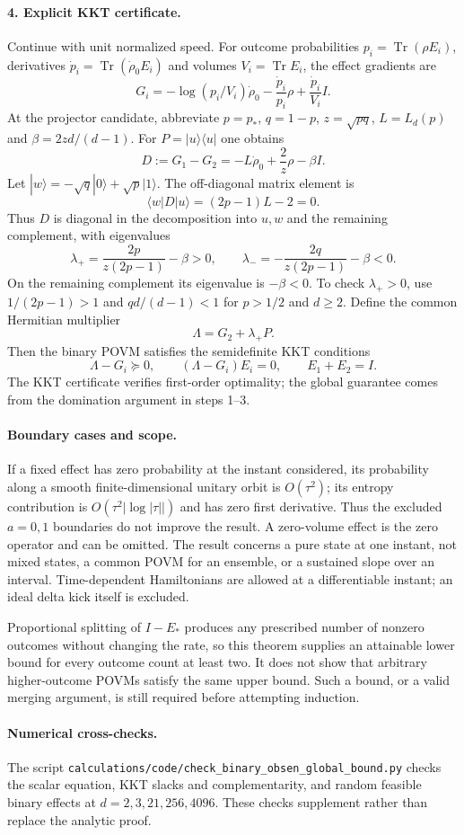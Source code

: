 \documentclass[11pt,a4paper]{article}
\newcommand{\Tr}{\operatorname{Tr}}
\begin{document}
\paragraph{4. Explicit KKT certificate.} Continue with unit normalized speed. For outcome probabilities $p_i=\Tr(\rho E_i)$, derivatives $\dot p_i=\Tr(\dot\rho_0 E_i)$ and volumes $V_i=\Tr E_i$, the effect gradients are
\[G_i=-\log(p_i/V_i)\dot\rho_0-\frac{\dot p_i}{p_i}\rho+\frac{\dot p_i}{V_i}I.\]
At the projector candidate, abbreviate $p=p_*$, $q=1-p$, $z=\sqrt{pq}$, $L=L_d(p)$ and $\beta=2zd/(d-1)$. For $P=|u\rangle\langle u|$ one obtains
\[D:=G_1-G_2=-L\dot\rho_0+\frac{2}{z}\rho-\beta I.\]
Let $|w\rangle=-\sqrt q|0\rangle+\sqrt p|1\rangle$. The off-diagonal matrix element is
\[\langle w|D|u\rangle=(2p-1)L-2=0.\]
Thus $D$ is diagonal in the decomposition into $u,w$ and the remaining complement, with eigenvalues
\[\lambda_+=\frac{2p}{z(2p-1)}-\beta>0,\qquad \lambda_-=-\frac{2q}{z(2p-1)}-\beta<0.\]
On the remaining complement its eigenvalue is $-\beta<0$. To check $\lambda_+>0$, use $1/(2p-1)>1$ and $qd/(d-1)<1$ for $p>1/2$ and $d\geq2$. Define the common Hermitian multiplier
\[\Lambda=G_2+\lambda_+P.\]
Then the binary POVM satisfies the semidefinite KKT conditions
\[\Lambda-G_i\succeq0,\qquad(\Lambda-G_i)E_i=0,\qquad E_1+E_2=I.\]
The KKT certificate verifies first-order optimality; the global guarantee comes from the domination argument in steps 1--3.
\paragraph{Boundary cases and scope.} If a fixed effect has zero probability at the instant considered, its probability along a smooth finite-dimensional unitary orbit is $O(\tau^2)$; its entropy contribution is $O(\tau^2|\log|\tau||)$ and has zero first derivative. Thus the excluded $a=0,1$ boundaries do not improve the result. A zero-volume effect is the zero operator and can be omitted. The result concerns a pure state at one instant, not mixed states, a common POVM for an ensemble, or a sustained slope over an interval. Time-dependent Hamiltonians are allowed at a differentiable instant; an ideal delta kick itself is excluded.

Proportional splitting of $I-E_*$ produces any prescribed number of nonzero outcomes without changing the rate, so this theorem supplies an attainable lower bound for every outcome count at least two. It does not show that arbitrary higher-outcome POVMs satisfy the same upper bound. Such a bound, or a valid merging argument, is still required before attempting induction.
\paragraph{Numerical cross-checks.} The script \texttt{calculations/code/check\_binary\_obsen\_global\_bound.py} checks the scalar equation, KKT slacks and complementarity, and random feasible binary effects at $d=2,3,21,256,4096$. These checks supplement rather than replace the analytic proof.
\end{document}
